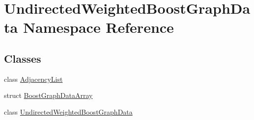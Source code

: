 \hypertarget{namespace_undirected_weighted_graph}{\section{Undirected\+Weighted\+BoostGraphData Namespace Reference}
\label{namespace_undirected_weighted_graph}
}
\subsection*{Classes}
\begin{DoxyCompactItemize}
\item 
class \hyperlink{class_undirected_weighted_graph_1_1_adjacency_list}{Adjacency\+List}
\item 
struct \hyperlink{struct_undirected_weighted_graph_1_1_graph_array}{BoostGraphData\+Array}
\item 
class \hyperlink{class_undirected_weighted_graph_1_1_undirected_weighted_graph}{Undirected\+Weighted\+BoostGraphData}
\end{DoxyCompactItemize}
